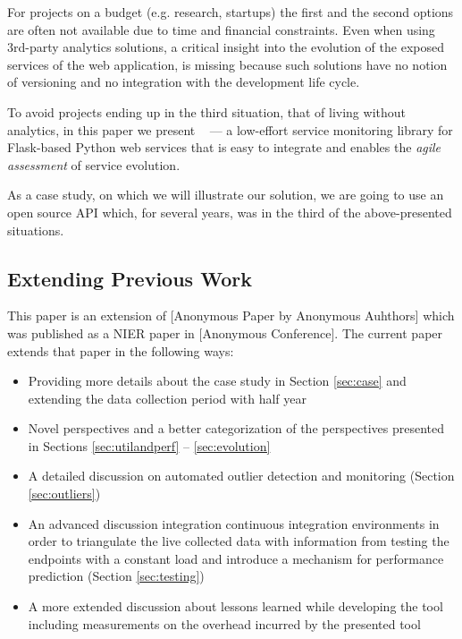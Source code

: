 
For projects on a budget (e.g. research, startups) the first and the second options are often not available due to time and financial constraints. Even when using 3rd-party analytics solutions, a critical insight into the evolution of the exposed services of the web application, is missing because such solutions have no notion of versioning and no integration with the development life cycle.~\cite{papazoglou2011managing}

To avoid projects ending up in the third situation, that of living without analytics, in this paper we present \tool~ --- a low-effort service monitoring library for Flask-based Python web services that is easy to integrate and enables the {\em agile assessment} of service evolution. \cite{Nier12b}

As a case study, on which we will illustrate our solution, we are going to use an open source API which, for several years, was in the third of the above-presented situations.


\subsection*{Extending Previous Work}

This paper is an extension of [Anonymous Paper by Anonymous Auhthors] which was published as a NIER paper in [Anonymous Conference]. The current paper extends that paper in the following ways: 
\begin{itemize}
  \item Providing more details about the case study in Section \ref{sec:case} and extending the data collection period with half year
  \item Novel perspectives and a better categorization of the perspectives presented in Sections \ref{sec:utilandperf} -- \ref{sec:evolution}
  \item A detailed discussion on automated outlier detection and monitoring (Section \ref{sec:outliers})
  \item An advanced discussion integration continuous integration environments in order to triangulate the live collected data with information from testing the endpoints with a constant load and introduce a mechanism for performance prediction (Section \ref{sec:testing})
  \item A more extended discussion about lessons learned while developing the tool including measurements on the overhead incurred by the presented tool 
\end{itemize}




